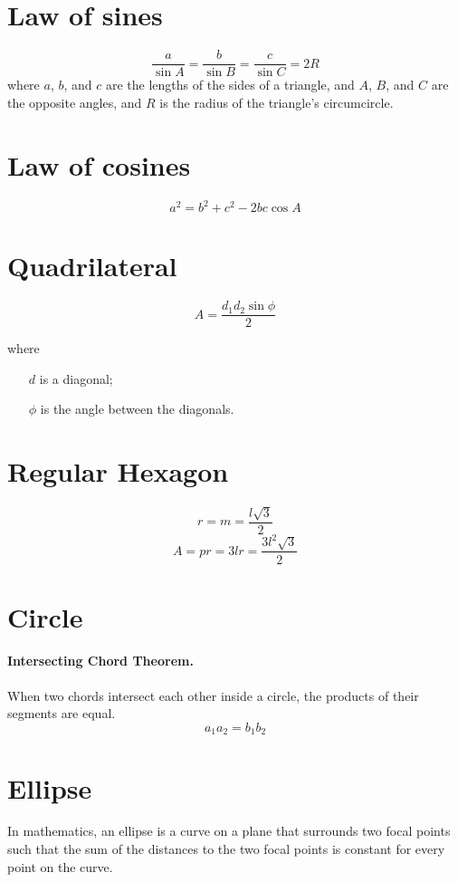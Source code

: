 \documentclass[oneside]{book} %
\theoremstyle{plain}
\begin{document}
\section{Law of sines}
\[\frac{a}{\sin{A}} = \frac{b}{\sin{B}} = \frac{c}{\sin{C}} = 2R\]
where \(a\), \(b\), and \(c\) are the lengths of the sides of a triangle, and
\(A\), \(B\), and \(C\) are the opposite angles, and \(R\) is the radius of
the triangle's circumcircle.

\section{Law of cosines}
\[a^2 = b^2 + c^2 - 2bc\cos{A}\]

\section{Quadrilateral}
\[A = \frac{d_1 d_2 \sin{\phi}}{2}\]

where

\begin{itemize}
  \item[\(d\)] is a diagonal;
  \item[\(\phi\)] is the angle between the diagonals.
\end{itemize}

\section{Regular Hexagon}

\[r = m = \frac{l \sqrt{3}}{2}\]
\[A = pr = 3 l r = \frac{3 l^2 \sqrt{3}}{2}\]

\section{Circle}
\paragraph{Intersecting Chord Theorem.} When two chords intersect each
other inside a circle, the products of their segments are equal.
\[a_1 a_2 = b_1 b_2\]

\section{Ellipse}
In mathematics, an ellipse is a curve on a plane that surrounds two focal points
such that the sum of the distances to the two focal points is constant for every
point on the curve.
\end{document}
